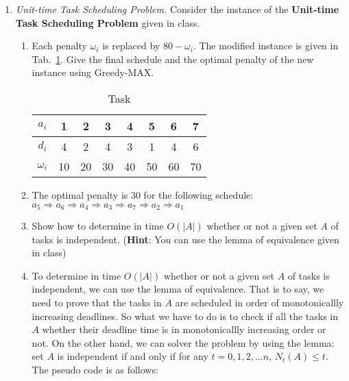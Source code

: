 \documentclass[12pt,a4paper]{article}
\makeatletter
\newtheorem*{solution}{Solution}
\theoremstyle{definition}
\renewenvironment{solution}[1][Solution] {\par\pushQED{\qed}\normalfont\topsep6\p@\@plus6\p@\relax\trivlist\item[\hskip\labelsep\bfseries#1\@addpunct{.}]\ignorespaces}{\popQED\endtrivlist\@endpefalse} \makeatother
\makeatother
\begin{document}
\begin{enumerate}
\begin{enumerate}
\end{enumerate}
\item \textit{Unit-time Task Scheduling Problem.} Consider the instance of the \textbf{Unit-time Task Scheduling Problem} given in class. 
    \begin{enumerate}
        \item Each penalty $\omega_{i}$ is replaced by $80-\omega_{i}$. The modified instance is given in Tab.~\ref{tab:1}. Give the final schedule and the optimal penalty of the new instance using Greedy-MAX.
		\begin{table}[H]
			\setlength{\abovecaptionskip}{0.cm}
			\setlength{\belowcaptionskip}{0.5cm}
			\centering
			\caption{Task}
			\label{tab:1}			
			\begin{tabular}{|c|ccccccc|}
				\hline
				$ a_{i} $&1&2&3&4&5&6&7\\
				\hline
				$ d_{i} $&4&2&4&3&1&4&6\\
                \hline
                $ \omega_{i} $&10&20&30&40&50&60&70\\
				\hline
			\end{tabular}
		\end{table}
	        \begin{solution}
	            The optimal penalty is 30 for the following schedule: $  a_{5}\Rightarrow a_{6}\Rightarrow a_{4}\Rightarrow a_{3}\Rightarrow a_{7}\Rightarrow a_{2}\Rightarrow a_{1}   $
	        \end{solution}
        \item Show how to determine in time $O(|A|)$ whether or not a given set $A$ of tasks is independent. (\textbf{Hint}: You can use the lemma of equivalence given in class)
 	        \begin{solution}
                To determine in time $O(|A|)$ whether or not a given set $A$ of tasks is independent, we can use the lemma of equivalence. That is to say, we need to prove that the tasks in $A$ are scheduled in order of monotonicallly increasing deadlines. So what we have to do is to check if all the tasks in $A$ whether their deadline time is in monotonicallly increasing order or not.
                On the other hand, we can solver the problem by using the lemma: set $A$ is independent if and only if for any $t=0,1,2,...n$, $N_t\left(A\right) \leq t$. The pseudo code is as follows:
        \begin{algorithm}[H]
		

\end{algorithm}
\end{solution}
\end{enumerate}
\end{enumerate}
\end{document}
